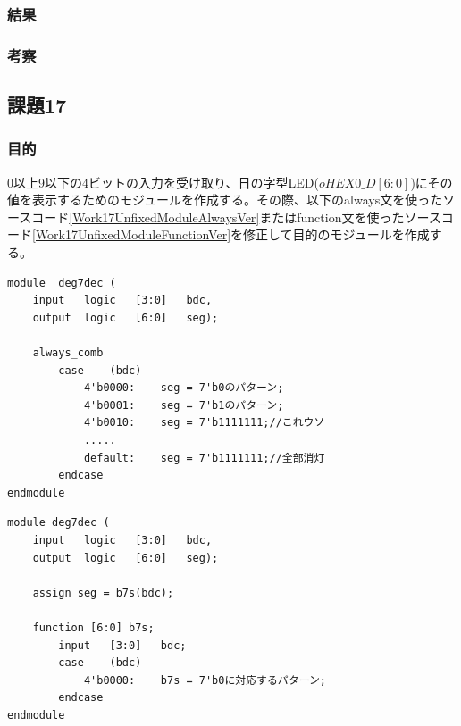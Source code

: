 \documentclass[a4paper]{jarticle}
\begin{document}
\subsubsection{結果}

\subsubsection{考察}
\subsection{課題17}
\subsubsection{目的}
0以上9以下の4ビットの入力を受け取り、日の字型LED($oHEX0\_D\left[6:0\right]$)にその値を表示するためのモジュールを作成する。その際、以下のalways文を使ったソースコード\ref{Work17UnfixedModuleAlwaysVer}またはfunction文を使ったソースコード\ref{Work17UnfixedModuleFunctionVer}を修正して目的のモジュールを作成する。
\begin{lstlisting}[caption=always文版,label=Work17UnfixedModuleAlwaysVer]
module	deg7dec (
	input	logic	[3:0]	bdc,
	output	logic	[6:0]	seg);

	always_comb
		case	(bdc)
			4'b0000:	seg = 7'b0のパターン;
			4'b0001:	seg = 7'b1のパターン;
			4'b0010:	seg = 7'b1111111;//これウソ
			.....
			default:	seg = 7'b1111111;//全部消灯
		endcase
endmodule
\end{lstlisting}
\begin{lstlisting}[caption=function文版,label=Work17UnfixedModuleFunctionVer]
module deg7dec (
	input	logic	[3:0]	bdc,
	output	logic	[6:0]	seg);

	assign seg = b7s(bdc);

	function [6:0] b7s;
		input	[3:0]	bdc;
		case	(bdc)
			4'b0000:	b7s = 7'b0に対応するパターン;
		endcase
endmodule
\end{lstlisting}
\end{document}
